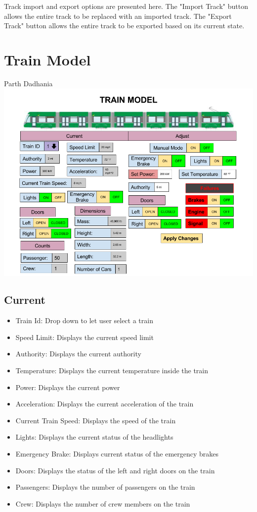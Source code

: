 \documentclass{scrreprt}
\begin{document}
Track import and export options are presented here. The "Import Track" button allows
the entire track to be replaced with an imported track. The "Export Track" button allows
the entire track to be exported based on its current state.

\chapter{Train Model}
\Large{Parth Dadhania}\\
\includegraphics[width=\textwidth]{TrainModelUI}

\section{Current}
\begin{itemize}
    \item Train Id: Drop down to let user select a train
    \item Speed Limit: Displays the current speed limit
    \item Authority: Displays the current authority
    \item Temperature: Displays the current temperature inside the train
    \item Power: Displays the current power
    \item Acceleration: Displays the current acceleration of the train
    \item Current Train Speed: Displays the speed of the train
    \item Lights: Displays the current status of the headlights
    \item Emergency Brake: Displays current status of the emergency brakes
    \item Doors: Displays the status of the left and right doors on the train
    \item Passengers: Displays the number of passengers on the train
    \item Crew: Displays the number of crew members on the train
\end{itemize}
\end{document}
